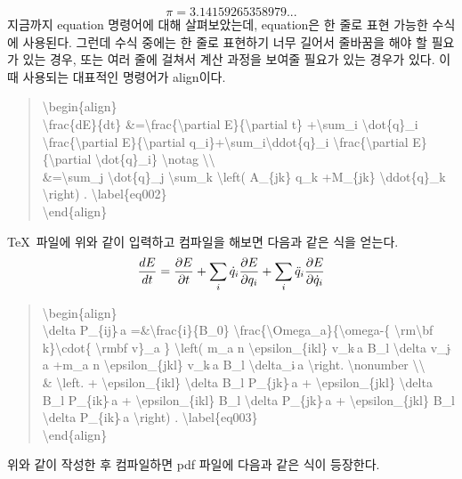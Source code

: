 \documentclass{gshs-report-v1.2}
\begin{document}
\begin{equation}
\pi=3.14159265358979... \nonumber
\end{equation}
지금까지 equation 명령어에 대해 살펴보았는데, equation은 한 줄로 표현 가능한 수식에 사용된다. 그런데 수식 중에는 한 줄로 표현하기 너무 길어서 줄바꿈을 해야 할 필요가 있는 경우, 또는 여러 줄에 걸쳐서 계산 과정을 보여줄 필요가 있는 경우가 있다. 이 때 사용되는 대표적인 명령어가 align이다.
\begin{quote}
	{\textbackslash}begin\{align\} \\
	{\textbackslash}frac\{dE\}\{dt\} 
	\&={\textbackslash}frac\{{\textbackslash}partial 
	E\}\{{\textbackslash}partial t\} +{\textbackslash}sum\_i 
	{\textbackslash}dot\{q\}\_i 
	{\textbackslash}frac\{{\textbackslash}partial 
	E\}\linebreak\{{\textbackslash}partial 
	q\_i\}+{\textbackslash}sum\_i{\textbackslash}ddot\{q\}\_i 
	{\textbackslash}frac\{{\textbackslash}partial 
	E\}\{{\textbackslash}partial {\textbackslash}dot\{q\}\_i\} 
	{\textbackslash}notag {\textbackslash}{\textbackslash} \\
	\&={\textbackslash}sum\_j {\textbackslash}dot\{q\}\_j 
	{\textbackslash}sum\_k {\textbackslash}left( A\_\{jk\} q\_k +M\_\{jk\} 
	{\textbackslash}ddot\{q\}\_k {\textbackslash}right) . 
	{\textbackslash}label\{eq002\}\\
	{\textbackslash}end\{align\}
\end{quote}
\TeX\ 파일에 위와 같이 입력하고 컴파일을 해보면 다음과 같은 식을 얻는다.
\begin{align}
\frac{dE}{dt} &=\frac{\partial E}{\partial t} +\sum_i \dot{q}_i \frac{\partial E}{\partial q_i} +\sum_i \ddot{q}_i \frac{\partial E}{\partial\dot{q}_i} \notag\\
\end{align}

\begin{quote}
	{\textbackslash}begin\{align\}\\
	{\textbackslash}delta P\_\{ij\}$\hat{\ }$a 
	=\&{\textbackslash}frac\{i\}\{B\_0\} 
	{\textbackslash}frac\{{\textbackslash}Omega\_a\}\{{\textbackslash}omega-\{
	 {\textbackslash}rm{\textbackslash}bf k\}{\textbackslash}cdot\{ 
	{\textbackslash}rm\linebreak{\textbackslash}bf v\}\_a \} 
	{\textbackslash}left( m\_a n {\textbackslash}epsilon\_\{ikl\} 
	v\_k$\hat{\ }$a B\_l {\textbackslash}delta v\_j$\hat{\ }$a +m\_a n 
	{\textbackslash}epsilon\_\{jkl\} v\_k$\hat{\ }$a B\_l 
	{\textbackslash}delta\_i$\hat{\ }$a {\textbackslash}right. 
	{\textbackslash}nonumber {\textbackslash}{\textbackslash} \\
	\& {\textbackslash}left. + {\textbackslash}epsilon\_\{ikl\} {\textbackslash}delta B\_l P\_\{jk\}$\hat{\ }$a + {\textbackslash}epsilon\_\{jkl\} {\textbackslash}delta B\_l P\_\{ik\}$\hat{\ }$a + {\textbackslash}epsilon\_\{ikl\} B\_l {\textbackslash}delta P\_\{jk\}$\hat{\ }$a + {\textbackslash}epsilon\_\{jkl\} B\_l {\textbackslash}delta P\_\{ik\}$\hat{\ }$a {\textbackslash}right) . {\textbackslash}label\{eq003\} \\
	{\textbackslash}end\{align\}
\end{quote}
위와 같이 작성한 후 컴파일하면 pdf 파일에 다음과 같은 식이 등장한다.
\end{document}
